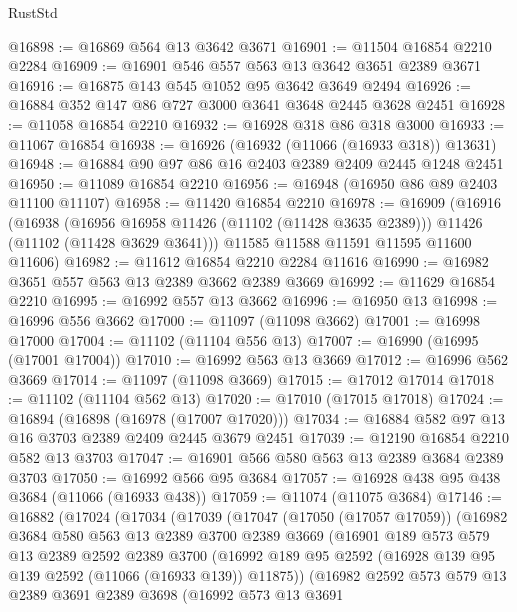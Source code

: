 \begin{lexlean}{RustStd}
\begin{coremodule}
@16898 := @16869 @564 @13 @3642 @3671
@16901 := @11504 @16854 @2210 @2284
@16909 := @16901 @546 @557 @563 @13 @3642 @3651 @2389 @3671
@16916 := @16875 @143 @545 @1052 @95 @3642 @3649 @2494
@16926 := @16884 @352 @147 @86 @727 @3000 @3641 @3648 @2445 @3628 @2451
@16928 := @11058 @16854 @2210
@16932 := @16928 @318 @86 @318 @3000
@16933 := @11067 @16854
@16938 := @16926 (@16932 (@11066 (@16933 @318)) @13631)
@16948 := @16884 @90 @97 @86 @16 @2403 @2389 @2409 @2445 @1248 @2451
@16950 := @11089 @16854 @2210
@16956 := @16948 (@16950 @86 @89 @2403 @11100 @11107)
@16958 := @11420 @16854 @2210
@16978 := @16909
    (@16916
      (@16938
        (@16956 @16958 @11426 (@11102 (@11428 @3635 @2389)))
        @11426
        (@11102 (@11428 @3629 @3641)))
      @11585
      @11588
      @11591
      @11595
      @11600
      @11606)
@16982 := @11612 @16854 @2210 @2284 @11616
@16990 := @16982 @3651 @557 @563 @13 @2389 @3662 @2389 @3669
@16992 := @11629 @16854 @2210
@16995 := @16992 @557 @13 @3662
@16996 := @16950 @13
@16998 := @16996 @556 @3662
@17000 := @11097 (@11098 @3662)
@17001 := @16998 @17000
@17004 := @11102 (@11104 @556 @13)
@17007 := @16990 (@16995 (@17001 @17004))
@17010 := @16992 @563 @13 @3669
@17012 := @16996 @562 @3669
@17014 := @11097 (@11098 @3669)
@17015 := @17012 @17014
@17018 := @11102 (@11104 @562 @13)
@17020 := @17010 (@17015 @17018)
@17024 := @16894 (@16898 (@16978 (@17007 @17020)))
@17034 := @16884 @582 @97 @13 @16 @3703 @2389 @2409 @2445 @3679 @2451
@17039 := @12190 @16854 @2210 @582 @13 @3703
@17047 := @16901 @566 @580 @563 @13 @2389 @3684 @2389 @3703
@17050 := @16992 @566 @95 @3684
@17057 := @16928 @438 @95 @438 @3684 (@11066 (@16933 @438))
@17059 := @11074 (@11075 @3684)
@17146 := @16882
    (@17024
      (@17034
        (@17039
          (@17047
            (@17050 (@17057 @17059))
            (@16982
              @3684
              @580
              @563
              @13
              @2389
              @3700
              @2389
              @3669
              (@16901
                @189
                @573
                @579
                @13
                @2389
                @2592
                @2389
                @3700
                (@16992 @189 @95 @2592 (@16928 @139 @95 @139 @2592 (@11066 (@16933 @139)) @11875))
                (@16982
                  @2592
                  @573
                  @579
                  @13
                  @2389
                  @3691
                  @2389
                  @3698
                  (@16992
                    @573
                    @13
                    @3691

\end{coremodule}
\end{lexlean}
